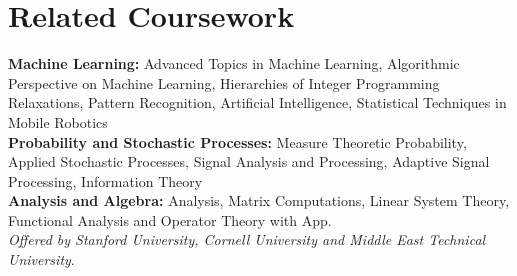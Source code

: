 \section{\mysidestyle \textcolor{olgray}{Related Coursework}}

\hspace{0mm}\textbf{Machine Learning:} Advanced Topics in Machine Learning\cornell, Algorithmic Perspective on Machine Learning\stanford,  Hierarchies of Integer Programming Relaxations\stanford, Pattern Recognition\metu, Artificial Intelligence\metu, Statistical Techniques in Mobile Robotics\metu  \vspace{1mm} \\
\hspace{-0.5mm}\textbf{Probability and Stochastic Processes:} Measure Theoretic Probability\cornell, Applied Stochastic Processes\cornell,  Signal Analysis and Processing\metu, Adaptive Signal Processing\metu, Information Theory\metu   \vspace{1mm} \\
\hspace{0mm}\textbf{Analysis and Algebra:} Analysis\cornell, Matrix Computations\cornell , Linear System Theory\metu, Functional Analysis and Operator Theory with App.\metu  \vspace{1mm} \\
\hspace{-1.5mm} \emph{Offered by \stanford Stanford University, \cornell Cornell University and \metu Middle East Technical University}.
